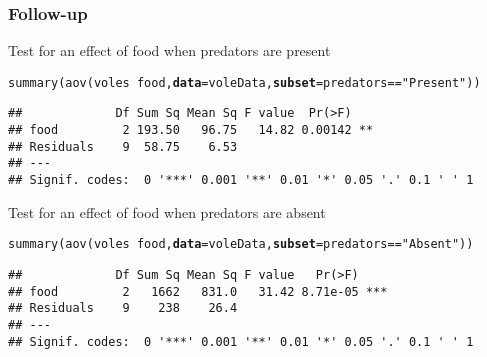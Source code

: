 \documentclass[color=usenames,dvipsnames]{beamer}\usepackage[]{graphicx}\usepackage[]{color}
\makeatletter
\newcommand{\hlstr}[1]{\textcolor[rgb]{0.749,0.012,0.012}{#1}}%
\newcommand{\hlopt}[1]{\textcolor[rgb]{0,0,0}{#1}}%
\newcommand{\hlstd}[1]{\textcolor[rgb]{0,0,0}{#1}}%
\newcommand{\hlkwc}[1]{\textcolor[rgb]{0,0,0}{\textbf{#1}}}%
\newcommand{\hlkwd}[1]{\textcolor[rgb]{0.004,0.004,0.506}{#1}}%
\newenvironment{kframe}{%
 \def\at@end@of@kframe{}%
 \ifinner\ifhmode%
  \def\at@end@of@kframe{\end{minipage}}%
  \begin{minipage}{\columnwidth}%
 \fi\fi%
 \def\FrameCommand##1{\hskip\@totalleftmargin \hskip-\fboxsep
 \colorbox{shadecolor}{##1}\hskip-\fboxsep
     \hskip-\linewidth \hskip-\@totalleftmargin \hskip\columnwidth}%
 \MakeFramed {\advance\hsize-\width
   \@totalleftmargin\z@ \linewidth\hsize
   \@setminipage}}%
 {\par\unskip\endMakeFramed%
 \at@end@of@kframe}
\newenvironment{knitrout}{}{} %
\makeatother
\begin{document}
\begin{frame}[fragile]
  \frametitle{Follow-up}
  Test for an effect of food when predators are present
\begin{knitrout}\scriptsize
{}\color{fgcolor}\begin{kframe}
\begin{alltt}
\hlkwd{summary}\hlstd{(}\hlkwd{aov}\hlstd{(voles} \hlopt{~} \hlstd{food,} \hlkwc{data}\hlstd{=voleData,} \hlkwc{subset}\hlstd{=predators}\hlopt{==}\hlstr{"Present"}\hlstd{))}
\end{alltt}
\begin{verbatim}
##             Df Sum Sq Mean Sq F value  Pr(>F)   
## food         2 193.50   96.75   14.82 0.00142 **
## Residuals    9  58.75    6.53                   
## ---
## Signif. codes:  0 '***' 0.001 '**' 0.01 '*' 0.05 '.' 0.1 ' ' 1
\end{verbatim}
\end{kframe}
\end{knitrout}
\pause
\vfill
  Test for an effect of food when predators are absent
\begin{knitrout}\scriptsize
{}\color{fgcolor}\begin{kframe}
\begin{alltt}
\hlkwd{summary}\hlstd{(}\hlkwd{aov}\hlstd{(voles} \hlopt{~} \hlstd{food,} \hlkwc{data}\hlstd{=voleData,} \hlkwc{subset}\hlstd{=predators}\hlopt{==}\hlstr{"Absent"}\hlstd{))}
\end{alltt}
\begin{verbatim}
##             Df Sum Sq Mean Sq F value   Pr(>F)    
## food         2   1662   831.0   31.42 8.71e-05 ***
## Residuals    9    238    26.4                     
## ---
## Signif. codes:  0 '***' 0.001 '**' 0.01 '*' 0.05 '.' 0.1 ' ' 1
\end{verbatim}
\end{kframe}
\end{knitrout}
\end{frame}
\end{document}
